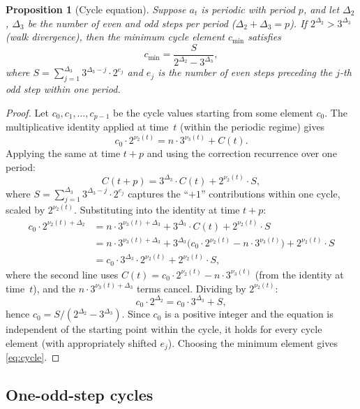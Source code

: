 \documentclass[11pt,a4paper]{article}
\theoremstyle{plain}
\newtheorem{proposition}[theorem]{Proposition}
\theoremstyle{definition}
\begin{document}
\begin{proposition}[Cycle equation]\label{prop:cycle-eq}
Suppose $a_t$ is periodic with period $p$, and let $\Delta_2$, $\Delta_3$
be the number of even and odd steps per period ($\Delta_2 + \Delta_3 = p$).
If $2^{\Delta_2} > 3^{\Delta_3}$ (walk divergence), then the minimum
cycle element $c_{\min}$ satisfies
\begin{equation}\label{eq:cycle}
  c_{\min} = \frac{S}{2^{\Delta_2} - 3^{\Delta_3}},
\end{equation}
where $S = \sum_{j=1}^{\Delta_3} 3^{\Delta_3 - j} \cdot 2^{e_j}$
and $e_j$ is the number of even steps preceding the $j$-th odd step
within one period.
\end{proposition}

\begin{proof}
Let $c_0, c_1, \ldots, c_{p-1}$ be the cycle values starting from
some element $c_0$.  The multiplicative identity applied at time~$t$
(within the periodic regime) gives
\[
  c_0 \cdot 2^{\nu_2(t)} = n \cdot 3^{\nu_3(t)} + C(t).
\]
Applying the same at time $t + p$ and using the correction recurrence
over one period:
\[
  C(t+p) = 3^{\Delta_3} \cdot C(t) + 2^{\nu_2(t)} \cdot S,
\]
where $S = \sum_{j=1}^{\Delta_3} 3^{\Delta_3 - j} \cdot 2^{e_j}$ captures
the ``$+1$'' contributions within one cycle, scaled by $2^{\nu_2(t)}$.
Substituting into the identity at time $t + p$:
\begin{align*}
  c_0 \cdot 2^{\nu_2(t) + \Delta_2}
  &= n \cdot 3^{\nu_3(t) + \Delta_3} + 3^{\Delta_3} \cdot C(t)
     + 2^{\nu_2(t)} \cdot S \\
  &= n \cdot 3^{\nu_3(t) + \Delta_3}
     + 3^{\Delta_3}\bigl(c_0 \cdot 2^{\nu_2(t)} - n \cdot 3^{\nu_3(t)}\bigr)
     + 2^{\nu_2(t)} \cdot S \\
  &= c_0 \cdot 3^{\Delta_3} \cdot 2^{\nu_2(t)} + 2^{\nu_2(t)} \cdot S,
\end{align*}
where the second line uses $C(t) = c_0 \cdot 2^{\nu_2(t)} - n \cdot 3^{\nu_3(t)}$
(from the identity at time~$t$), and the $n \cdot 3^{\nu_3(t)+\Delta_3}$ terms
cancel.  Dividing by $2^{\nu_2(t)}$:
\[
  c_0 \cdot 2^{\Delta_2} = c_0 \cdot 3^{\Delta_3} + S,
\]
hence $c_0 = S / (2^{\Delta_2} - 3^{\Delta_3})$.  Since $c_0$ is
a positive integer and the equation is independent of the starting
point within the cycle, it holds for every cycle element (with
appropriately shifted $e_j$).  Choosing the minimum element gives
\eqref{eq:cycle}.
\end{proof}

\subsection{One-odd-step cycles}
\end{document}
